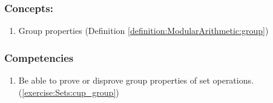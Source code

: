 \subsubsection*{Concepts:}
\begin{enumerate}
\item 
Group properties   (Definition \ref{definition:ModularArithmetic:group})
\end{enumerate}

\subsubsection*{Competencies}
\begin{enumerate}
\item
Be able to prove or disprove group properties of set operations. (\ref{exercise:Sets:cup_group}) 
\end{enumerate}

